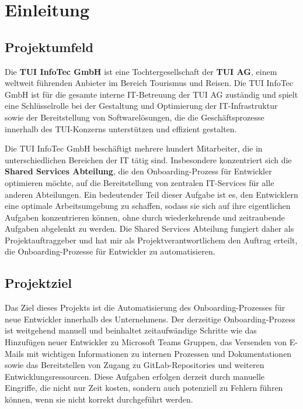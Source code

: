 \section{Einleitung}
\label{sec:Einleitung}

\subsection{Projektumfeld} 
\label{sec:Projektumfeld}

Die \textbf{TUI InfoTec GmbH} ist eine Tochtergesellschaft der \textbf{TUI AG}, einem weltweit führenden Anbieter im Bereich Tourismus und Reisen. Die TUI InfoTec GmbH ist für die gesamte interne IT-Betreuung der TUI AG zuständig und spielt eine Schlüsselrolle bei der Gestaltung und Optimierung der IT-Infrastruktur sowie der Bereitstellung von Softwarelösungen, die die Geschäftsprozesse innerhalb des TUI-Konzerns unterstützen und effizient gestalten.

Die TUI InfoTec GmbH beschäftigt mehrere hundert Mitarbeiter, die in unterschiedlichen Bereichen der IT tätig sind. Insbesondere konzentriert sich die \textbf{Shared Services Abteilung}, die den Onboarding-Prozess für Entwickler optimieren möchte, auf die Bereitstellung von zentralen IT-Services für alle anderen Abteilungen. Ein bedeutender Teil dieser Aufgabe ist es, den Entwicklern eine optimale Arbeitsumgebung zu schaffen, sodass sie sich auf ihre eigentlichen Aufgaben konzentrieren können, ohne durch wiederkehrende und zeitraubende Aufgaben abgelenkt zu werden. Die Shared Services Abteilung fungiert daher als Projektauftraggeber und hat mir als Projektverantwortlichem den Auftrag erteilt, die Onboarding-Prozesse für Entwickler zu automatisieren.

\subsection{Projektziel} 
\label{sec:Projektziel}

Das Ziel dieses Projekts ist die Automatisierung des Onboarding-Prozesses für neue Entwickler innerhalb des Unternehmens. Der derzeitige Onboarding-Prozess ist weitgehend manuell und beinhaltet zeitaufwändige Schritte wie das Hinzufügen neuer Entwickler zu Microsoft Teams Gruppen, das Versenden von E-Mails mit wichtigen Informationen zu internen Prozessen und Dokumentationen sowie das Bereitstellen von Zugang zu GitLab-Repositories und weiteren Entwicklungsressourcen. Diese Aufgaben erfolgen derzeit durch manuelle Eingriffe, die nicht nur Zeit kosten, sondern auch potenziell zu Fehlern führen können, wenn sie nicht korrekt durchgeführt werden.

